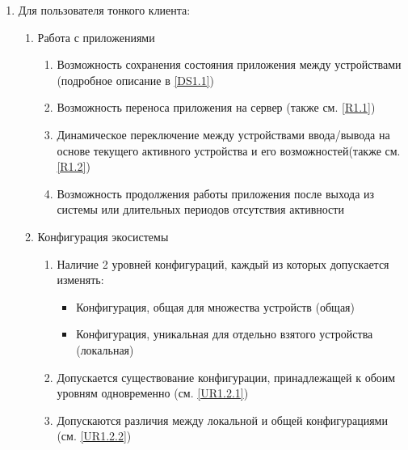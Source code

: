 \begin{enumerate}[label={\bfseries ПТ-\arabic*}]
   \item Для пользователя тонкого клиента:
         \begin{enumerate}[label*={\bfseries.\arabic*}]
            \item Работа с приложениями
                  \begin{enumerate}[label*={\bfseries.\arabic*}]
                     \item Возможность сохранения состояния приложения между устройствами (подробное описание в \ref{DS1.1}) %
                     \item Возможность переноса приложения на сервер (также см. \ref{R1.1}) %
                     \item Динамическое переключение между устройствами ввода/вывода на основе текущего активного устройства и его возможностей(также см. \ref{R1.2}) %
                     \item Возможность продолжения работы приложения после выхода из системы или длительных периодов отсутствия активности
                  \end{enumerate}
            \item Конфигурация экосистемы
                  \begin{enumerate}[label*={\bfseries.\arabic*}]
                     \item Наличие 2 уровней конфигураций, каждый из которых допускается изменять:
                           \begin{itemize}
                              \item Конфигурация, общая для множества устройств (общая)
                              \item Конфигурация, уникальная для отдельно взятого устройства (локальная)
                                    \label{UR1.2.1}
                           \end{itemize}
                     \item Допускается существование конфигурации, принадлежащей к обоим уровням одновременно (см. \ref{UR1.2.1})
                           \label{UR1.2.2}
                     \item Допускаются различия между локальной и общей конфигурациями (см. \ref{UR1.2.2})

\end{enumerate}
\end{enumerate}
\end{enumerate}
